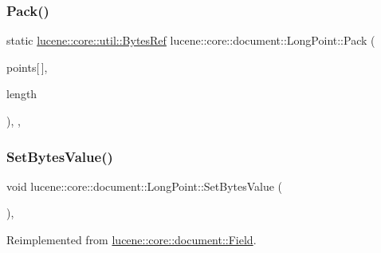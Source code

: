 \subsubsection{\texorpdfstring{Pack()}{Pack()}}
{\footnotesize\ttfamily static \mbox{\hyperlink{classlucene_1_1core_1_1util_1_1BytesRef}{lucene\+::core\+::util\+::\+Bytes\+Ref}} lucene\+::core\+::document\+::\+Long\+Point\+::\+Pack (\begin{DoxyParamCaption}\item[{\mbox{\hyperlink{ZlibCrc32_8h_a2c212835823e3c54a8ab6d95c652660e}{const}} int64\+\_\+t}]{points\mbox{[}$\,$\mbox{]},  }\item[{\mbox{\hyperlink{ZlibCrc32_8h_a2c212835823e3c54a8ab6d95c652660e}{const}} uint32\+\_\+t}]{length }\end{DoxyParamCaption})\hspace{0.3cm}{\ttfamily [inline]}, {\ttfamily [static]}, {\ttfamily [private]}}

\mbox{\label{classlucene_1_1core_1_1document_1_1LongPoint_a3ba17f0b827e583a9b568e368dd798ac}} 
\subsubsection{\texorpdfstring{Set\+Bytes\+Value()}{SetBytesValue()}}
{\footnotesize\ttfamily void lucene\+::core\+::document\+::\+Long\+Point\+::\+Set\+Bytes\+Value (\begin{DoxyParamCaption}\item[{\mbox{\hyperlink{ZlibCrc32_8h_a2c212835823e3c54a8ab6d95c652660e}{const}} \mbox{\hyperlink{classlucene_1_1core_1_1util_1_1BytesRef}{lucene\+::core\+::util\+::\+Bytes\+Ref}} \&}]{ }\end{DoxyParamCaption})\hspace{0.3cm}{\ttfamily [inline]}, {\ttfamily [virtual]}}



Reimplemented from \mbox{\hyperlink{classlucene_1_1core_1_1document_1_1Field_a41d077e63ce6fae8677b8df6b29821bd}{lucene\+::core\+::document\+::\+Field}}.

\mbox{\label{classlucene_1_1core_1_1document_1_1LongPoint_a5bc668dfdf190b8bc0a52808a6580b40}} 
